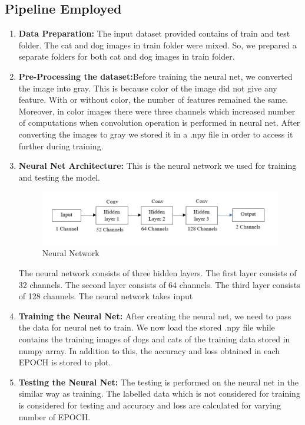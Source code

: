 \documentclass[12pt]{article}
\begin{document}
\subsection{Pipeline Employed}
\begin{enumerate}
\item \textbf{Data Preparation:} The input dataset provided contains of train and test folder. The cat and dog images in train folder were mixed. So, we prepared a separate folders for both cat and dog images in train folder. 

\item \textbf{Pre-Processing the dataset:}Before training the neural net, we converted the image into gray. This is because color of the image did not give any feature. With or without color, the number of features remained the same. Moreover, in color images there were three channels which increased number of computations when convolution operation is performed in neural net. After converting the images to gray we stored it in a .npy file in order to access it further during training.

\item \textbf{Neural Net Architecture:}
This is the neural network we used for training and testing the model.
\newpage
\begin{figure}[h]
    \centering
    \includegraphics[width=16cm]{nn}
    \caption{Neural Network}
    \label{fig:Neural Network}
\end{figure}
The neural network consists of three hidden layers. The first layer consists of 32 channels. The second layer consists of 64 channels. The third layer consists of 128 channels. The neural network takes input 

\item \textbf{Training the Neural Net:}
After creating the neural net, we need to pass the data for neural net to train. We now load the stored .npy file while contains the training images of dogs and cats of the training data stored in numpy array. In addition to this, the accuracy and loss obtained in each EPOCH is stored to plot.

\item \textbf{Testing the Neural Net:}
The testing is performed on the neural net in the similar way as training. The labelled data which is not considered for training is considered for testing and accuracy and loss are calculated for varying number of EPOCH. 


\end{enumerate}
\end{document}
